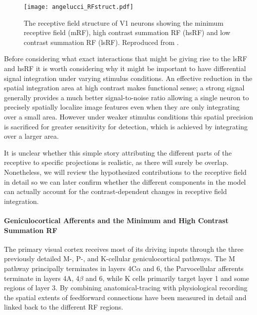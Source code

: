 \begin{figure}
	\centering
        \texttt{[image: angelucci\_RFstruct.pdf]}
	\caption[The structure of a receptive field in V1. Reproduced from
      \cite{Angelucci2006}.]{The receptive field structure of V1
      neurons showing the minimum receptive field (mRF), high contrast
      summation RF (hsRF) and low contrast summation RF
      (lsRF). Reproduced from \cite{Angelucci2006}.}
	\label{RFstruct}
\end{figure}

Before considering what exact interactions that might be giving rise
to the lsRF and hsRF it is worth considering why it might be important
to have differential signal integration under varying stimulus
conditions. An effective reduction in the spatial integration area at
high contrast makes functional sense; a strong signal generally
provides a much better signal-to-noise ratio allowing a single neuron
to precisely spatially localize image features even when they are only
integrating over a small area. However under weaker stimulus
conditions this spatial precision is sacrificed for greater
sensitivity for detection, which is achieved by integrating over a
larger area.

It is unclear whether this simple story attributing the different
parts of the receptive to specific projections is realistic, as there
will surely be overlap. Nonetheless, we will review the hypothesized
contributions to the receptive field in detail so we can later confirm
whether the different components in the model can actually account for
the contrast-dependent changes in receptive field integration.

\paragraph{Geniculocortical Afferents and the Minimum and High Contrast Summation RF} \label{AfferentBackground}

The primary visual cortex receives most of its driving inputs through
the three previously detailed M-, P-, and K-cellular geniculocortical
pathways. The M pathway principally terminates in layers 4C$\alpha$
and 6, the Parvocellular afferents terminate in layers 4A, 4$\beta$
and 6, while K cells primarily target layer 1 and some regions of
layer 3. By combining anatomical-tracing with physiological
recording the spatial extents of feedforward connections have been
measured in detail and linked back to the different RF regions.

